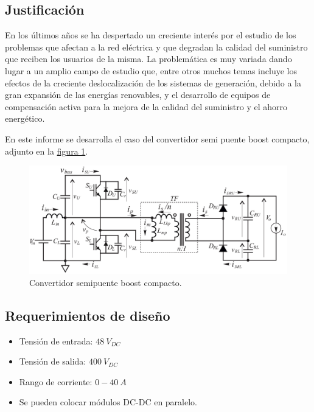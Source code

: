 \subsection{Justificación}

En los últimos años se ha despertado un creciente interés por el estudio de los problemas que afectan a la red eléctrica y que degradan la calidad del suministro que reciben los usuarios de la misma. La problemática es muy variada dando lugar a un amplio campo de estudio que, entre otros muchos temas incluye los efectos de la creciente deslocalización de los sistemas de generación, debido a la gran expansión de las energías renovables, y el desarrollo de equipos de compensación activa para la mejora de la calidad del suministro y el ahorro energético.

En este informe se desarrolla el caso del convertidor semi puente boost compacto, adjunto en la \hyperref[fig:topologiareferencia]{figura 1}.

\begin{figure}
	\centering
	\includegraphics[width=0.9\linewidth]{img/topologiaReferencia}
	\caption[]{Convertidor semipuente boost compacto.}
	\label{fig:topologiareferencia}
\end{figure}

\subsection{Requerimientos de diseño}

\begin{itemize}
	\item Tensión de entrada: $48 \ V_{DC}$
	\item Tensión de salida: $400 \ V_{DC}$
	\item Rango de corriente: $0-40 \ A$
	\item Se pueden colocar módulos DC-DC en paralelo.
\end{itemize}

\clearpage



